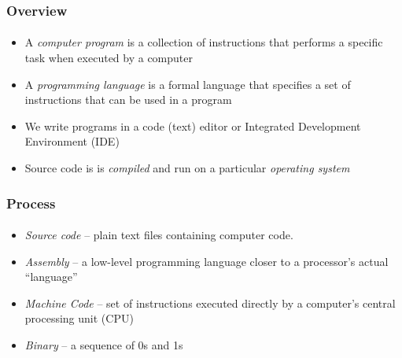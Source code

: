 \documentclass[]{beamer}
\begin{document}
\begin{frame}
    \frametitle{Overview}
    \framesubtitle{}

\begin{itemize}[<+->]
  \item A \emph{computer program} is a collection of instructions
that performs a specific task when executed by a computer

  \item A \emph{programming language} is a formal language that 
specifies a set of instructions that can be used in a program

  \item We write programs in a code (text) editor or Integrated
  Development Environment (IDE)
  
  \item Source code is is \emph{compiled} and run on a particular
  \emph{operating system}
\end{itemize}

\end{frame}

\begin{frame}
    \frametitle{Process}
    \framesubtitle{}  
    
\begin{itemize}[<+->]
  \item \emph{Source code} -- plain text files containing computer code.

  \item \emph{Assembly} -- a low-level programming language
  closer to a processor's actual ``language''
  
  \item \emph{Machine Code} -- set of instructions executed directly 
  by a computer's central processing unit (CPU)

  \item \emph{Binary} -- a sequence of 0s and 1s 
\end{itemize}


\end{frame}
\end{document}
